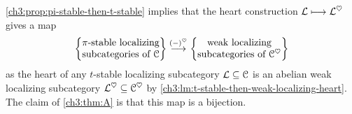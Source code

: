





\cref{ch3:prop:pi-stable-then-t-stable} implies that the heart construction $\L\longmapsto \L^\heart$ gives a map 
\[\pistable\overset{(-)^\heart}\to \weaklocalizing\] 
as the heart of any $t$-stable localizing subcategory $\L\subseteq \C$ is an abelian weak localizing subcategory $\L^\heart \subseteq \C^\heart$ by \cref{ch3:lm:t-stable-then-weak-localizing-heart}. The claim of \cref{ch3:thm:A} is that this map is a bijection. 

